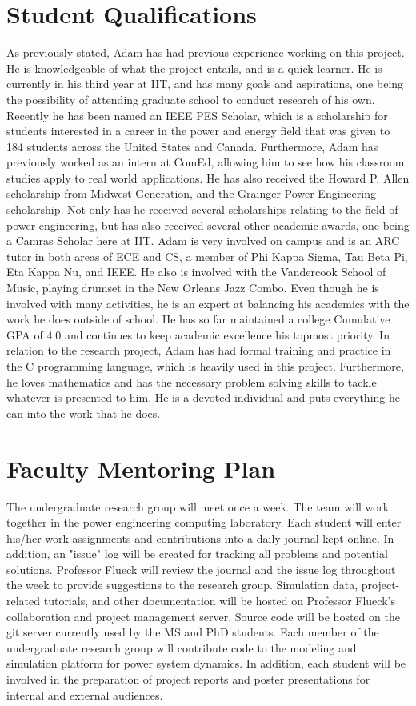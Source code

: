 \documentclass[]{article}
\begin{document}
\section{Student Qualifications}
As previously stated, Adam has had previous experience working on this project. He is knowledgeable of what the project entails, and is a quick learner. He is currently in his third year at IIT, and has many goals and aspirations, one being the possibility of attending graduate school to conduct research of his own. Recently he has been named an IEEE PES Scholar, which is a scholarship for students interested in a career in the power and energy field that was given to 184 students across the United States and Canada. Furthermore, Adam has previously worked as an intern at ComEd, allowing him to see how his classroom studies apply to real world applications. He has also received the Howard P. Allen scholarship from Midwest Generation, and the Grainger Power Engineering scholarship. Not only has he received several scholarships relating to the field of power engineering, but has also received several other academic awards, one being a Camras Scholar here at IIT. Adam is very involved on campus and is an ARC tutor in both areas of ECE and CS, a member of Phi Kappa Sigma, Tau Beta Pi, Eta Kappa Nu, and IEEE. He also is involved with the Vandercook School of Music, playing drumset in the New Orleans Jazz Combo. Even though he is involved with many activities, he is an expert at balancing his academics with the work he does outside of school. He has so far maintained a college Cumulative GPA of 4.0 and continues to keep academic excellence his topmost priority. In relation to the research project, Adam has had formal training and practice in the C programming language, which is heavily used in this project. Furthermore, he loves mathematics and has the necessary problem solving skills to tackle whatever is presented to him. He is a devoted individual and puts everything he can into the work that he does. 
\section{Faculty Mentoring Plan}
The undergraduate research group will meet once a week. The team will work together in the power engineering computing laboratory. Each student will enter his/her work assignments and contributions into a daily journal kept online. In addition, an "issue" log will be created for tracking all problems and potential solutions. Professor Flueck will review the journal and the issue log throughout the week to provide suggestions to the research group. Simulation data, project-related tutorials, and other documentation will be hosted on Professor Flueck's collaboration and project management server. Source code will be hosted on the git server currently used by the MS and PhD students. Each member of the undergraduate research group will contribute code to the modeling and simulation platform for power system dynamics. In addition, each student will be involved in the preparation of project reports and poster presentations for internal and external audiences.
\end{document}
